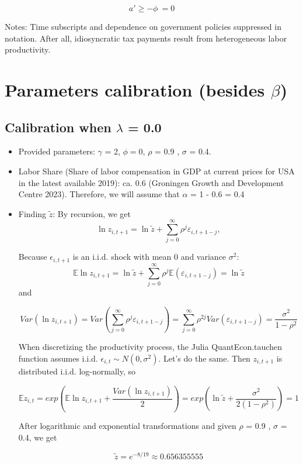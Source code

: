 \documentclass{article}
\begin{document}
\[
a' \geq -\phi\ = 0
\]

Notes: Time subscripts and dependence on government policies suppressed in notation. After all, idiosyncratic tax payments result from heterogeneous labor productivity.


\section*{Parameters calibration (besides \(\beta\))}
\subsection*{Calibration when \(\lambda\) = 0.0}

\begin{itemize}
    \item Provided parameters: \(\gamma\) =  2, \(\phi = 0\),
\(\rho\) = 0.9 , \(\sigma\) = 0.4.
    \item  Labor Share (Share of labor compensation in GDP at current prices for USA in the latest available 2019): ca. 0.6 (Groningen Growth and Development Centre 2023). Therefore, we will assume that \(\alpha\) = 1 - 0.6 = 0.4\
    \item Finding \(\tilde{z}\): By recursion, we get
\[
\ln z_{i,t+1} = \ln \tilde{z} + \sum_{j=0}^{\infty} \rho^{j} \varepsilon_{i,t+1-j},
\]

Because \(\epsilon_{i,t+1}\) is an i.i.d. shock with mean 0 and variance \(\sigma^{2}\):
\[
\mathbb{E}\ln z_{i,t+1} = \ln \tilde{z} + \sum_{j=0}^{\infty} \rho^{j} \mathbb{E}(\varepsilon_{i,t+1-j}) = \ln \tilde{z}
\]
and

\[
{Var}(\ln z_{i,t+1}) = {Var}(\sum_{j=0}^{\infty} \rho^{j} \varepsilon_{i,t+1-j}) = \sum_{j=0}^{\infty} \rho^{2j} {Var}(\varepsilon_{i,t+1-j}) = \frac{\sigma^{2}}{1-\rho^{2}}
\]

When discretizing the productivity process, the Julia QuantEcon.tauchen function assumes i.i.d. \(\epsilon_{i,t} \sim N(0, \sigma^2)\). Let's do the same. Then 
\(z_{i,t+1}\) is distributed i.i.d. log-normally, so 

\[
\mathbb{E}z_{i,t} = exp(\mathbb{E}\ln z_{i,t+1} + \frac{{Var}(\ln z_{i,t+1})}{2}) = exp(\ln \tilde{z}+\frac{\sigma^{2}}{2(1-\rho^{2})}) =1
\]

After logarithmic and exponential transformations and given  \(\rho\) = 0.9 , \(\sigma\) = 0.4, we get 

\[
\tilde{z} = e^{-8/19} \approx 0.656355555
\]



\end{itemize}
\end{document}
